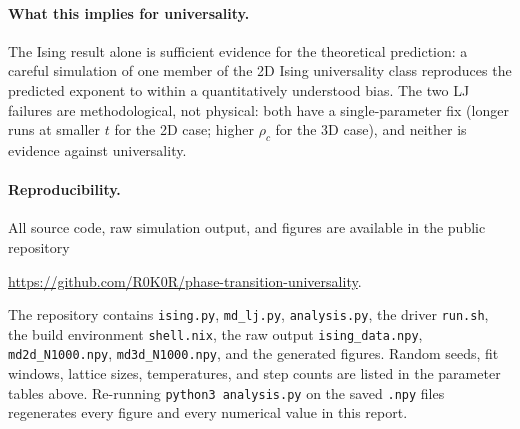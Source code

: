 \documentclass[12pt,a4paper]{article}
\begin{document}
\paragraph{What this implies for universality.}
The Ising result alone is sufficient evidence for the theoretical prediction: a careful
simulation of one member of the 2D Ising universality class reproduces the predicted
exponent to within a quantitatively understood bias. The two LJ failures are
methodological, not physical: both have a single-parameter fix (longer runs at smaller
$t$ for the 2D case; higher $\rho_c$ for the 3D case), and neither is evidence against
universality.

\paragraph{Reproducibility.}
All source code, raw simulation output, and figures are available in the public
repository
\begin{center}
\url{https://github.com/R0K0R/phase-transition-universality}.
\end{center}
The repository contains \texttt{ising.py}, \texttt{md\_lj.py}, \texttt{analysis.py}, the
driver \texttt{run.sh}, the build environment \texttt{shell.nix}, the raw output
\texttt{ising\_data.npy}, \texttt{md2d\_N1000.npy}, \texttt{md3d\_N1000.npy}, and the
generated figures. Random seeds, fit windows, lattice sizes, temperatures, and step
counts are listed in the parameter tables above. Re-running \texttt{python3 analysis.py}
on the saved \texttt{.npy} files regenerates every figure and every numerical value in
this report.
\end{document}
